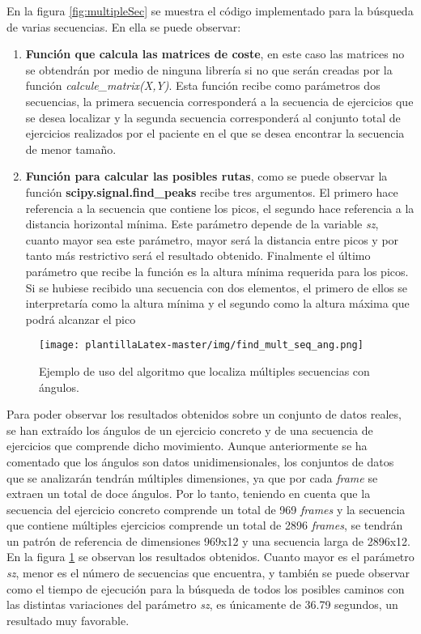 En la figura \ref{fig:multipleSec} se muestra el código implementado para la búsqueda de varias secuencias. En ella se puede observar:
\begin{enumerate}
    \item \textbf{Función que calcula las matrices de coste}, en este caso las matrices no se obtendrán por medio de ninguna librería si no que serán creadas por la función \textit{calcule\_matrix(X,Y)}. Esta función recibe como parámetros dos secuencias, la primera secuencia corresponderá a la secuencia de ejercicios que se desea localizar y la segunda secuencia corresponderá al conjunto total de ejercicios realizados por el paciente en el que se desea encontrar la secuencia de menor tamaño. 
    \item \textbf{Función para calcular las posibles rutas}, como se puede observar la función \textbf{scipy.signal.find\_peaks} recibe tres argumentos. El primero hace referencia a la secuencia que contiene los picos, el segundo hace referencia a la distancia horizontal mínima. Este parámetro depende de la variable \textit{sz}, cuanto mayor sea este parámetro, mayor será la distancia entre picos y por tanto más restrictivo será el resultado obtenido. Finalmente el último parámetro que recibe la función es la altura mínima requerida para los picos. Si se hubiese recibido una secuencia con dos elementos, el primero de ellos se interpretaría como la altura mínima y el segundo como la altura máxima que podrá alcanzar el pico
\end{enumerate}

\begin{figure}[H]
    \centering
    \texttt{[image: plantillaLatex-master/img/find\_mult\_seq\_ang.png]}
    \caption{Ejemplo de uso del algoritmo que localiza múltiples secuencias con ángulos.}
    \label{fig:multipleAng}
\end{figure}

Para poder observar los resultados obtenidos sobre un conjunto de datos reales, se han extraído los ángulos de un ejercicio concreto y de una secuencia de ejercicios que comprende dicho movimiento. Aunque anteriormente se ha comentado que los ángulos son datos unidimensionales, los conjuntos de datos que se analizarán tendrán múltiples dimensiones, ya que por cada \textit{frame} se extraen un total de doce ángulos. Por lo tanto, teniendo en cuenta que la secuencia del ejercicio concreto comprende un total de 969 \textit{frames} y la secuencia que contiene múltiples ejercicios comprende un total de 2896 \textit{frames}, se tendrán un patrón de referencia de dimensiones 969x12 y una secuencia larga de 2896x12. En la figura \ref{fig:multipleAng} se observan los resultados obtenidos. Cuanto mayor es el parámetro \emph{sz}, menor es el número de secuencias que encuentra, y también se puede observar como el tiempo de ejecución para la búsqueda de todos los posibles caminos con las distintas variaciones del parámetro \emph{sz}, es únicamente de 36.79 segundos, un resultado muy favorable.

